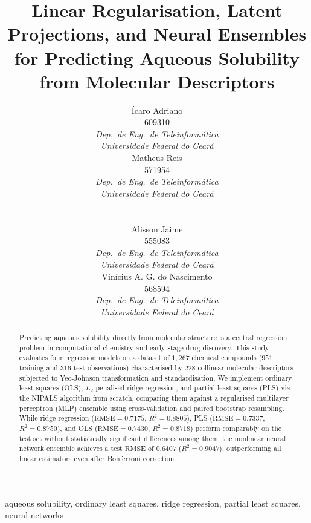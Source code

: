 \documentclass[conference]{IEEEtran}
\begin{document}
\title{Linear Regularisation, Latent Projections, and Neural Ensembles for Predicting Aqueous Solubility from Molecular Descriptors}

\newcommand{\autorbloco}[2]{%
  \begin{minipage}[t]{0.46\textwidth}\centering
  {\normalsize #1}\\[0.35em]
  {\small #2\\
  \textit{Dep.\ de Eng.\ de Teleinformática}\\
  \textit{Universidade Federal do Ceará}}
  \end{minipage}}

\author{%
\parbox{\textwidth}{\centering
\autorbloco{Ícaro Adriano}{609310}\hfill\autorbloco{Matheus Reis}{571954}\\[1.4em]
\autorbloco{Alisson Jaime}{555083}\hfill\autorbloco{Vinícius A. G. do Nascimento}{568594}}
}

\maketitle

\begin{abstract}
Predicting aqueous solubility directly from molecular structure is a central regression problem in computational chemistry and early-stage drug discovery. This study evaluates four regression models on a dataset of $1{,}267$ chemical compounds ($951$ training and $316$ test observations) characterised by $228$ collinear molecular descriptors subjected to Yeo-Johnson transformation and standardisation. We implement ordinary least squares (OLS), $L_2$-penalised ridge regression, and partial least squares (PLS) via the NIPALS algorithm from scratch, comparing them against a regularised multilayer perceptron (MLP) ensemble using cross-validation and paired bootstrap resampling. While ridge regression ($\mathrm{RMSE} = 0.7175$, $R^2 = 0.8805$), PLS ($\mathrm{RMSE} = 0.7337$, $R^2 = 0.8750$), and OLS ($\mathrm{RMSE} = 0.7430$, $R^2 = 0.8718$) perform comparably on the test set without statistically significant differences among them, the nonlinear neural network ensemble achieves a test $\mathrm{RMSE}$ of $0.6407$ ($R^2 = 0.9047$), outperforming all linear estimators even after Bonferroni correction.
\end{abstract}

\begin{IEEEkeywords}
aqueous solubility, ordinary least squares, ridge regression, partial least squares, neural networks
\end{IEEEkeywords}
\end{document}
